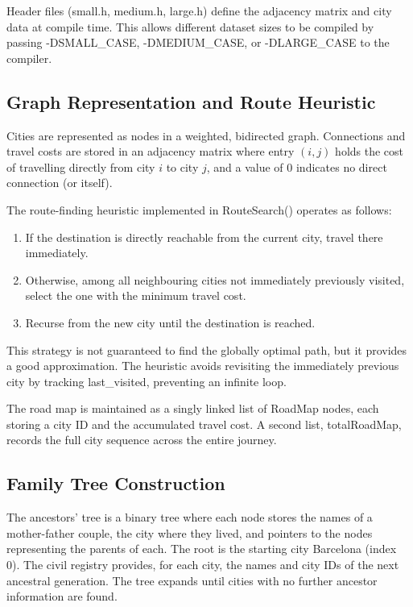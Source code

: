 \documentclass[12pt,a4paper]{article}
\begin{document}
Header files (small.h, medium.h, large.h) define the adjacency matrix and city data at compile time. This allows different dataset sizes to be compiled by passing -DSMALL\_CASE, -DMEDIUM\_CASE, or -DLARGE\_CASE to the compiler.

\subsection*{Graph Representation and Route Heuristic}

Cities are represented as nodes in a weighted, bidirected graph. Connections and travel costs are stored in an adjacency matrix where entry $(i, j)$ holds the cost of travelling directly from city $i$ to city $j$, and a value of 0 indicates no direct connection (or itself).

The route-finding heuristic implemented in RouteSearch() operates as follows:

\begin{enumerate}
  \item If the destination is directly reachable from the current city, travel there immediately.
  \item Otherwise, among all neighbouring cities not immediately previously visited, select the one with the minimum travel cost.
  \item Recurse from the new city until the destination is reached.
\end{enumerate}

This strategy is not guaranteed to find the globally optimal path, but it provides a good approximation. The heuristic avoids revisiting the immediately previous city by tracking last\_visited, preventing an infinite loop.

The road map is maintained as a singly linked list of RoadMap nodes, each storing a city ID and the accumulated travel cost. A second list, totalRoadMap, records the full city sequence across the entire journey.

\subsection*{Family Tree Construction}

The ancestors' tree is a binary tree where each node stores the names of a mother-father couple, the city where they lived, and pointers to the nodes representing the parents of each. The root is the starting city Barcelona (index 0). The civil registry provides, for each city, the names and city IDs of the next ancestral generation. The tree expands until cities with no further ancestor information are found.
\end{document}
